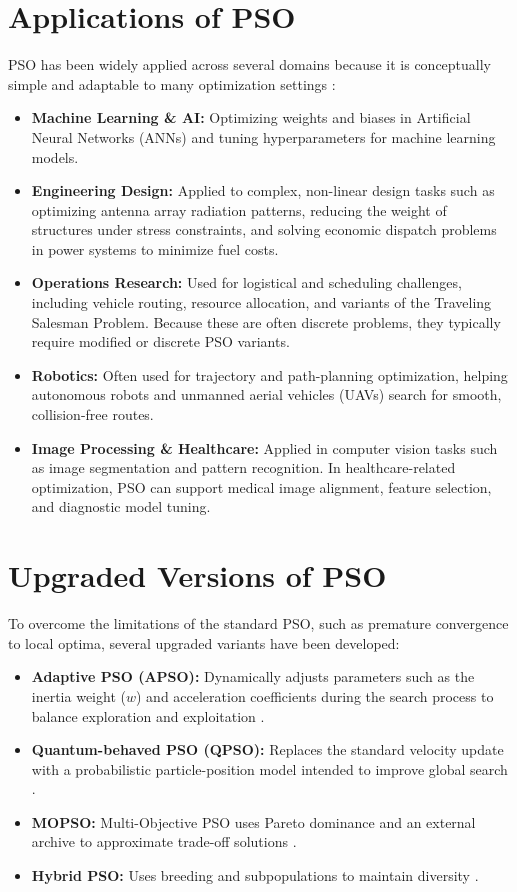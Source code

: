 \documentclass[12pt,a4paper]{article}
\begin{document}
\section{Applications of PSO}
PSO has been widely applied across several domains because it is conceptually simple and adaptable to many optimization settings \cite{poli2007}:
\begin{itemize}
    \item \textbf{Machine Learning \& AI:} Optimizing weights and biases in Artificial Neural Networks (ANNs) and tuning hyperparameters for machine learning models.
    \item \textbf{Engineering Design:} Applied to complex, non-linear design tasks such as optimizing antenna array radiation patterns, reducing the weight of structures under stress constraints, and solving economic dispatch problems in power systems to minimize fuel costs.
    \item \textbf{Operations Research:} Used for logistical and scheduling challenges, including vehicle routing, resource allocation, and variants of the Traveling Salesman Problem. Because these are often discrete problems, they typically require modified or discrete PSO variants.
    \item \textbf{Robotics:} Often used for trajectory and path-planning optimization, helping autonomous robots and unmanned aerial vehicles (UAVs) search for smooth, collision-free routes.
    \item \textbf{Image Processing \& Healthcare:} Applied in computer vision tasks such as image segmentation and pattern recognition. In healthcare-related optimization, PSO can support medical image alignment, feature selection, and diagnostic model tuning.
\end{itemize}
\section{Upgraded Versions of PSO}
To overcome the limitations of the standard PSO, such as premature convergence to local optima, several upgraded variants have been developed:
\begin{itemize}
    \item \textbf{Adaptive PSO (APSO):} Dynamically adjusts parameters such as the inertia weight ($w$) and acceleration coefficients during the search process to balance exploration and exploitation \cite{zhan2009}.
    \item \textbf{Quantum-behaved PSO (QPSO):} Replaces the standard velocity update with a probabilistic particle-position model intended to improve global search \cite{sun2004}.
    \item \textbf{MOPSO:} Multi-Objective PSO uses Pareto dominance and an external archive to approximate trade-off solutions \cite{coello2004}.
    \item \textbf{Hybrid PSO:} Uses breeding and subpopulations to maintain diversity \cite{lovbjerg2001}.
\end{itemize}
\end{document}
